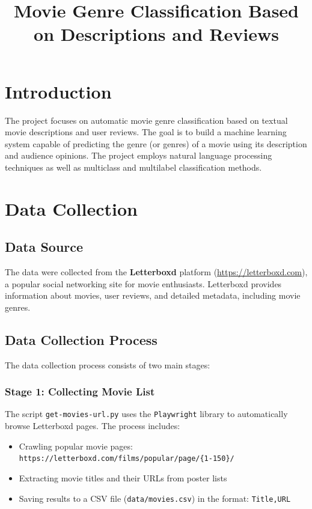 \documentclass[12pt,a4paper]{article}
\title{Movie Genre Classification Based on Descriptions and Reviews}
\begin{document}
\maketitle

\tableofcontents
\newpage

\section{Introduction}

The project focuses on automatic movie genre classification based on textual movie descriptions and user reviews. The goal is to build a machine learning system capable of predicting the genre (or genres) of a movie using its description and audience opinions. The project employs natural language processing techniques as well as multiclass and multilabel classification methods.

\section{Data Collection}

\subsection{Data Source}

The data were collected from the \textbf{Letterboxd} platform (\url{https://letterboxd.com}), a popular social networking site for movie enthusiasts. Letterboxd provides information about movies, user reviews, and detailed metadata, including movie genres.

\subsection{Data Collection Process}

The data collection process consists of two main stages:

\subsubsection{Stage 1: Collecting Movie List}

The script \texttt{get-movies-url.py} uses the \texttt{Playwright} library to automatically browse Letterboxd pages. The process includes:

\begin{itemize}

    \item Crawling popular movie pages: \texttt{https://letterboxd.com/films/popular/page/\{1-150\}/}

    \item Extracting movie titles and their URLs from poster lists

    \item Saving results to a CSV file (\texttt{data/movies.csv}) in the format: \texttt{Title,URL}

\end{itemize}
\end{document}
